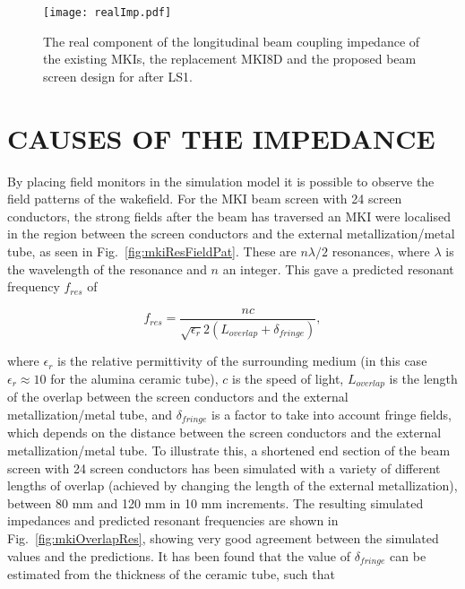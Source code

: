 \documentclass{JAC2003}
\begin{document}
\begin{figure}
\begin{center}\texttt{[image: realImp.pdf]}
\caption{The real component of the longitudinal beam coupling impedance of the existing MKIs, the replacement MKI8D and the proposed beam screen design for after LS1.}
\label{fig:MKIScreenImp}
\end{center}
\end{figure}

\section{CAUSES OF THE IMPEDANCE}

By placing field monitors in the simulation model it is possible to observe the field patterns of the wakefield. For the MKI beam screen with 24 screen conductors, the strong fields after the beam has traversed an MKI were localised in the region between the screen conductors and the external metallization/metal tube, as seen in Fig.~\ref{fig:mkiResFieldPat}. These are $n \lambda /2$ resonances, where $\lambda$ is the wavelength of the resonance and $n$ an integer. This gave a predicted resonant frequency $f_{res}$ of 

\begin{equation}
f_{res} = \frac{nc}{\sqrt{\epsilon_{r}}2 \left( L_{overlap} + \delta_{fringe} \right)},
\label{eqn:imp-overlap-fres}
\end{equation}

where $\epsilon_{r}$ is the relative permittivity of the surrounding medium (in this case $\epsilon_{r} \approx 10$ for the alumina ceramic tube), $c$ is the speed of light, $L_{overlap}$ is the length of the overlap between the screen conductors and the external metallization/metal tube, and $\delta_{fringe}$ is a factor to take into account fringe fields, which depends on the distance between the screen conductors and the external metallization/metal tube. To illustrate this, a shortened end section of the beam screen with 24 screen conductors has been simulated with a variety of different lengths of overlap (achieved by changing the length of the external metallization), between 80 mm and 120 mm in 10 mm increments. The resulting simulated impedances and predicted resonant frequencies are shown in Fig.~\ref{fig:mkiOverlapRes}, showing very good agreement between the simulated values and the predictions. It has been found that the value of $\delta_{fringe}$ can be estimated from the thickness of the ceramic tube, such that
\end{document}
